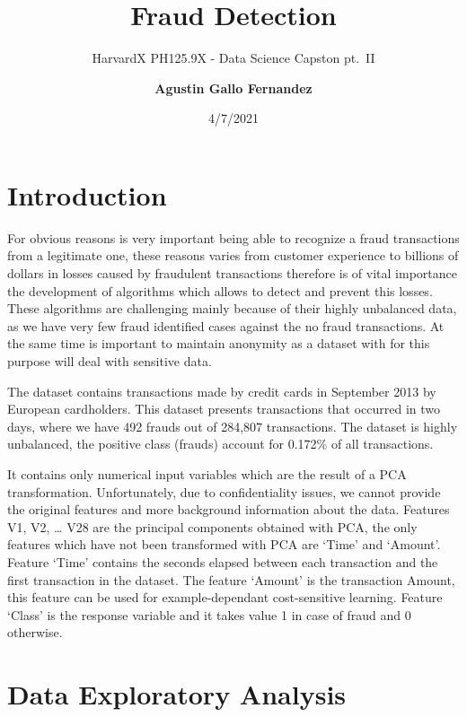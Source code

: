 \documentclass[
]{article}
\title{\textbf{Fraud Detection}}
\subtitle{HarvardX PH125.9X - Data Science Capston pt.~II}
\author{\textbf{Agustin Gallo Fernandez}}
\date{4/7/2021}
\begin{document}
\maketitle

\newpage{}

{
\setcounter{tocdepth}{2}
\tableofcontents
}
\newpage

\hypertarget{introduction}{%
\section{Introduction}\label{introduction}}

For obvious reasons is very important being able to recognize a fraud
transactions from a legitimate one, these reasons varies from customer
experience to billions of dollars in losses caused by fraudulent
transactions therefore is of vital importance the development of
algorithms which allows to detect and prevent this losses. These
algorithms are challenging mainly because of their highly unbalanced
data, as we have very few fraud identified cases against the no fraud
transactions. At the same time is important to maintain anonymity as a
dataset with for this purpose will deal with sensitive data.

The dataset contains transactions made by credit cards in September 2013
by European cardholders. This dataset presents transactions that
occurred in two days, where we have 492 frauds out of 284,807
transactions. The dataset is highly unbalanced, the positive class
(frauds) account for 0.172\% of all transactions.

It contains only numerical input variables which are the result of a PCA
transformation. Unfortunately, due to confidentiality issues, we cannot
provide the original features and more background information about the
data. Features V1, V2, \ldots{} V28 are the principal components
obtained with PCA, the only features which have not been transformed
with PCA are `Time' and `Amount'. Feature `Time' contains the seconds
elapsed between each transaction and the first transaction in the
dataset. The feature `Amount' is the transaction Amount, this feature
can be used for example-dependant cost-sensitive learning. Feature
`Class' is the response variable and it takes value 1 in case of fraud
and 0 otherwise.

\newpage

\hypertarget{data-exploratory-analysis}{%
\section{Data Exploratory Analysis}\label{data-exploratory-analysis}}
\end{document}

